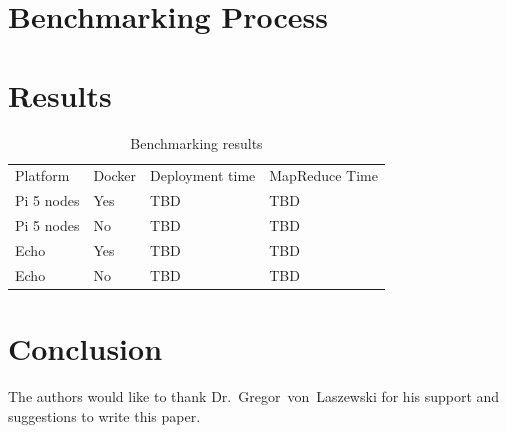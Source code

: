 \section{Benchmarking Process}


\section{Results}

\begin{table}[hbt]
\centering
\caption{Benchmarking results}\label{t:results-table}
\begin{tabular}{llll}
Platform    & Docker & Deployment time & MapReduce Time \\
Pi 5 nodes  & Yes    & TBD             & TBD            \\
Pi 5 nodes  & No     & TBD             & TBD            \\
Echo        & Yes    & TBD             & TBD            \\
Echo        & No     & TBD             & TBD            \\
\end{tabular}
\end{table}



\section{Conclusion}



\begin{acks}

  The authors would like to thank Dr.~Gregor~von~Laszewski for his
  support and suggestions to write this paper.

\end{acks}



